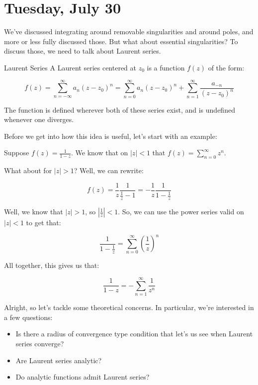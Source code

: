 \section{Tuesday, July 30}


We've discussed integrating around removable singularities and around poles, and more or less fully discussed those. But what about essential singularities? To discuss those, we need to talk about Laurent series.

\begin{defbo}{Laurent Series}{}
A Laurent series centered at $z_0$ is a function $f(z)$ of the form:

$$f(z) = \sum_{n = -\infty}^\infty a_n(z-z_0)^n = \sum_{n = 0}^\infty a_n(z-z_0)^n + \sum_{n = 1}^\infty \frac{a_{-n}}{(z-z_0)^n}$$

The function is defined wherever both of these series exist, and is undefined whenever one diverges.
\end{defbo}

Before we get into how this idea is useful, let's start with an example:

\begin{ex}{}{} Suppose $f(z) = \frac{1}{1-z}$. We know that on $|z| < 1$ that $f(z) = \sum_{n = 0}^\infty z^n$.

What about for $|z| > 1$? Well, we can rewrite:

$$f(z) = \frac{1}{z}\frac{1}{\frac{1}{z} - 1} = -\frac{1}{z}\frac{1}{1-\frac{1}{z} }$$

Well, we know that $|z| > 1$, so $\left|\frac{1}{z}\right| < 1$. So, we can use the power series valid on $|z| < 1$ to get that:

$$\frac{1}{1- \frac{1}{z}} = \sum_{n = 0}^\infty \left(\frac{1}{z}\right)^n$$

All together, this gives us that:

$$\frac{1}{1-z} = -\sum_{n = 1}^\infty \frac{1}{z^n}$$

\end{ex}

Alright, so let's tackle some theoretical concerns. In particular, we're interested in a few questions:

\begin{itemize}
\item Is there a radius of convergence type condition that let's us see when Laurent series converge?
\item Are Laurent series analytic?
\item Do analytic functions admit Laurent series?
\end{itemize}

